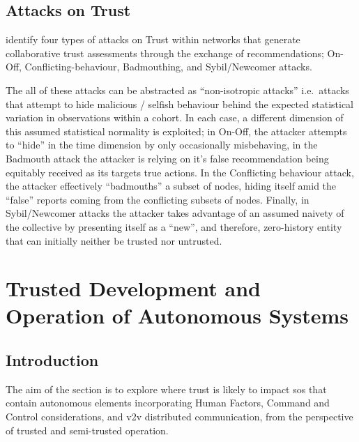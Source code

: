 
\subsection{Attacks on Trust}

\citet{Liu2010} identify four types of attacks on Trust within networks that generate collaborative trust assessments through the exchange of recommendations; On-Off, Conflicting-behaviour, Badmouthing, and Sybil/Newcomer attacks. 

The all of these attacks can be abstracted as ``non-isotropic attacks'' i.e.\ attacks that attempt to hide malicious / selfish behaviour behind the expected statistical variation in observations within a cohort.
In each case, a different dimension of this assumed statistical normality is exploited; in On-Off, the attacker attempts to ``hide'' in the time dimension by only occasionally misbehaving, in the Badmouth attack the attacker is relying on it's false recommendation being equitably received as its targets true actions. 
In the Conflicting behaviour attack, the attacker effectively ``badmouths'' a subset of nodes, hiding itself amid the ``false'' reports coming from the conflicting subsets of nodes. 
Finally, in Sybil/Newcomer attacks the attacker takes advantage of an assumed naivety of the collective by presenting itself as a ``new'', and therefore, zero-history entity that can initially neither be trusted nor untrusted.


\section{Trusted Development and Operation of Autonomous Systems}\label{sec:trust_autonomy}

\subsection{Introduction}

The aim of the section is to explore where trust is likely to impact \gls{sos} that contain autonomous elements incorporating Human Factors, Command and Control considerations, and \gls{v2v} distributed communication, from the perspective of trusted and semi-trusted operation.


